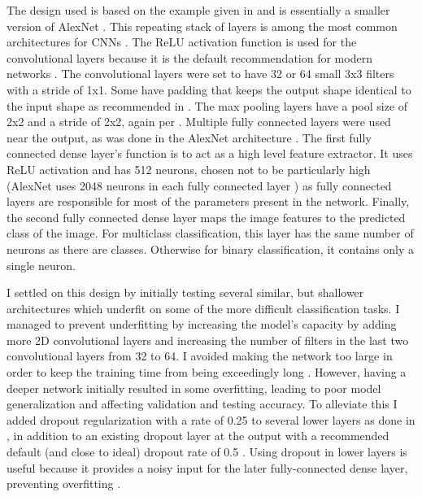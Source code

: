 \documentclass[10pt,twocolumn,letterpaper]{article}
\begin{document}
The design used is based on the example given in \cite{gupta_2017} and is essentially a smaller version of AlexNet \cite{krizhevsky2012imagenet}. This repeating stack of layers is among the most common architectures for CNNs \cite{karpathy_2018_cnn}. The ReLU activation function is used for the convolutional layers because it is the default recommendation for modern networks \cite[p.174]{goodfellow2016deep}. The convolutional layers were set to have 32 or 64 small 3x3 filters with a stride of 1x1. Some have padding that keeps the output shape identical to the input shape as recommended in \cite{karpathy_2018_cnn}. The max pooling layers have a pool size of 2x2 and a stride of 2x2, again per \cite{karpathy_2018_cnn}. Multiple fully connected layers were used near the output, as was done in the AlexNet architecture \cite{krizhevsky2012imagenet}. The first fully connected dense layer's function is to act as a high level feature extractor. It uses ReLU activation and has 512 neurons, chosen not to be particularly high (AlexNet uses 2048 neurons in each fully connected layer \cite{krizhevsky2012imagenet}) as fully connected layers are responsible for most of the parameters present in the network. Finally, the second fully connected dense layer maps the image features to the predicted class of the image. For multiclass classification, this layer has the same number of neurons as there are classes. Otherwise for binary classification, it contains only a single neuron.

I settled on this design by initially testing several similar, but shallower architectures which underfit on some of the more difficult classification tasks. I managed to prevent underfitting by increasing the model's capacity \cite[p.111]{goodfellow2016deep} by adding more 2D convolutional layers and increasing the number of filters in the last two convolutional layers from 32 to 64. I avoided making the network too large in order to keep the training time from being exceedingly long \cite{karpathy_2018_nn1}. However, having a deeper network initially resulted in some overfitting, leading to poor model generalization and affecting validation and testing accuracy. To alleviate this I added dropout regularization with a rate of 0.25 to several lower layers as done in \cite{gupta_2017}, in addition to an existing dropout layer at the output with a recommended default (and close to ideal) dropout rate of 0.5 \cite{srivastava2014dropout}. Using dropout in lower layers is useful because it provides a noisy input for the later fully-connected dense layer, preventing overfitting \cite{srivastava2014dropout}.
\end{document}
